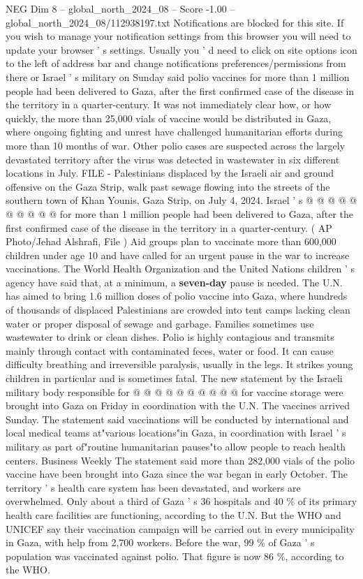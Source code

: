 \begin{textsample}{NEG Dim 8 – global\_north\_2024\_08 – Score -1.00 – global\_north\_2024\_08/112938197.txt}  \label{ex:f8_neg_122}
Notifications are blocked for this site.
If you wish to manage your notification settings from this browser you will need to update your browser ' s settings.
Usually you ' d need to click on site options icon to the left of address bar and change notifications preferences/permissions from there or Israel ' s military on Sunday said polio vaccines for more than 1 million people had been delivered to Gaza, after the first confirmed case of the disease in the territory in a quarter-century.
It was not immediately clear how, or how quickly, the more than 25,000 vials of vaccine would be distributed in Gaza, where ongoing fighting and unrest have challenged humanitarian efforts during more than 10 months of war.
Other polio cases are suspected across the largely devastated territory after the virus was detected in wastewater in six different locations in July.
FILE - Palestinians displaced by the Israeli air and ground offensive on the Gaza Strip, walk past sewage flowing into the streets of the southern town of Khan Younis, Gaza Strip, on July 4, 2024.
Israel ' s @ @ @ @ @ @ @ @ @ @ for more than 1 million people had been delivered to Gaza, after the first confirmed case of the disease in the territory in a quarter-century. ( AP Photo/Jehad Alshrafi, File ) Aid groups plan to vaccinate more than 600,000 children under age 10 and have called for an urgent pause in the war to increase vaccinations.
The World Health Organization and the United Nations children ' s agency have said that, at a minimum, a \textbf{seven-day} pause is needed.
The U.N. has aimed to bring 1.6 million doses of polio vaccine into Gaza, where hundreds of thousands of displaced Palestinians are crowded into tent camps lacking clean water or proper disposal of sewage and garbage.
Families sometimes use wastewater to drink or clean dishes.
Polio is highly contagious and transmits mainly through contact with contaminated feces, water or food.
It can cause difficulty breathing and irreversible paralysis, usually in the legs.
It strikes young children in particular and is sometimes fatal.
The new statement by the Israeli military body responsible for @ @ @ @ @ @ @ @ @ @ for vaccine storage were brought into Gaza on Friday in coordination with the U.N.
The vaccines arrived Sunday.
The statement said vaccinations will be conducted by international and local medical teams at"various locations"in Gaza, in coordination with Israel ' s military as part of"routine humanitarian pauses"to allow people to reach health centers.
Business Weekly The statement said more than 282,000 vials of the polio vaccine have been brought into Gaza since the war began in early October.
The territory ' s health care system has been devastated, and workers are overwhelmed.
Only about a third of Gaza ' s 36 hospitals and 40 \% of its primary health care facilities are functioning, according to the U.N.
But the WHO and UNICEF say their vaccination campaign will be carried out in every municipality in Gaza, with help from 2,700 workers.
Before the war, 99 \% of Gaza ' s population was vaccinated against polio.
That figure is now 86 \%, according to the WHO.

\end{textsample}
